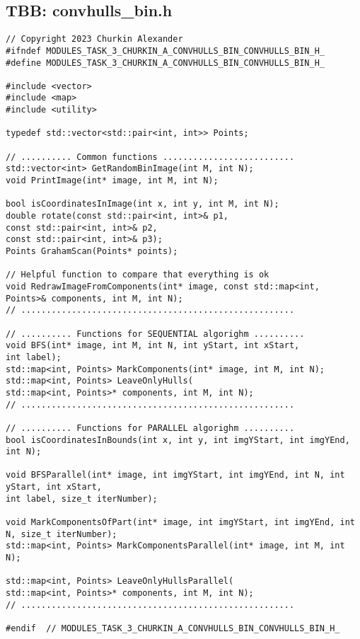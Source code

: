 \documentclass[14pt, russian]{extarticle}
\begin{document}
	\subsection{TBB: convhulls\_bin.h}
	\begin{lstlisting}
// Copyright 2023 Churkin Alexander
#ifndef MODULES_TASK_3_CHURKIN_A_CONVHULLS_BIN_CONVHULLS_BIN_H_
#define MODULES_TASK_3_CHURKIN_A_CONVHULLS_BIN_CONVHULLS_BIN_H_

#include <vector>
#include <map>
#include <utility>

typedef std::vector<std::pair<int, int>> Points;

// .......... Common functions ..........................
std::vector<int> GetRandomBinImage(int M, int N);
void PrintImage(int* image, int M, int N);

bool isCoordinatesInImage(int x, int y, int M, int N);
double rotate(const std::pair<int, int>& p1,
const std::pair<int, int>& p2,
const std::pair<int, int>& p3);
Points GrahamScan(Points* points);

// Helpful function to compare that everything is ok
void RedrawImageFromComponents(int* image, const std::map<int, Points>& components, int M, int N);
// ......................................................

// .......... Functions for SEQUENTIAL algorighm ..........
void BFS(int* image, int M, int N, int yStart, int xStart,
int label);
std::map<int, Points> MarkComponents(int* image, int M, int N);
std::map<int, Points> LeaveOnlyHulls(
std::map<int, Points>* components, int M, int N);
// ......................................................

// .......... Functions for PARALLEL algorighm ..........
bool isCoordinatesInBounds(int x, int y, int imgYStart, int imgYEnd, int N);

void BFSParallel(int* image, int imgYStart, int imgYEnd, int N, int yStart, int xStart,
int label, size_t iterNumber);

void MarkComponentsOfPart(int* image, int imgYStart, int imgYEnd, int N, size_t iterNumber);
std::map<int, Points> MarkComponentsParallel(int* image, int M, int N);

std::map<int, Points> LeaveOnlyHullsParallel(
std::map<int, Points>* components, int M, int N);
// ......................................................

#endif  // MODULES_TASK_3_CHURKIN_A_CONVHULLS_BIN_CONVHULLS_BIN_H_
	\end{lstlisting}
	\newpage
	
\end{document}
